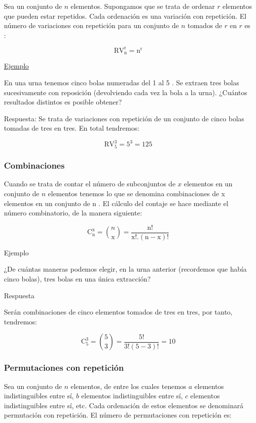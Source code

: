 \documentclass[
]{article}
\begin{document}
Sea un conjunto de \(n\) elementos. Supongamos que se trata de ordenar \(r\)
elementos que pueden estar repetidos. Cada ordenación es una variación
con repetición. El número de variaciones con repetición para un conjunto
de \(n\) tomados de \(r\) en \(r\) es :

\[
\mathrm{RV}_{\mathrm{n}}^{\mathrm{r}}=\mathrm{n}^{\mathrm{r}}
\]

\ul{Ejemplo}

En una urna tenemos cinco bolas numeradas del 1 al 5 . Se extraen tres
bolas sucesivamente con reposición (devolviendo cada vez la bola a la
urna). ¿Cuántos resultados distintos es posible obtener?

Respuesta: Se trata de variaciones con repetición de un conjunto de
cinco bolas tomadas de tres en tres. En total tendremos:

\[
\mathrm{RV}_{5}^{3}=5^{3}=125
\]

\subsubsection{Combinaciones}\label{combinaciones}

Cuando se trata de contar el número de subconjuntos de \(x\) elementos en un conjunto de \(n\) elementos tenemos lo que se denomina combinaciones de
x elementos en un conjunto de n . El cálculo del contaje se hace
mediante el número combinatorio, de la manera siguiente:

\[
\mathrm{C}_{\mathrm{n}}^{\mathrm{x}}=\binom{n}{\mathrm{x}}=\frac{\mathrm{n!}}{\mathrm{x}!.(\mathrm{n}-\mathrm{x})!}
\]

Ejemplo

¿De cuántas maneras podemos elegir, en la urna anterior (recordemos que
había cinco bolas), tres bolas en una única extracción?

Respuesta

Serán combinaciones de cinco elementos tomados de tres en tres, por
tanto, tendremos:

\[
\mathrm{C}_{5}^{3}=\binom{5}{3}=\frac{5!}{3!(5-3)!}=10
\]

\subsubsection{Permutaciones con repetición}\label{permutaciones-con-repeticiuxf3n}

Sea un conjunto de \(n\) elementos, de entre los cuales tenemos \(a\)
elementos indistinguibles entre sí, \(b\) elementos indistinguibles entre
sí, \(c\) elementos indistinguibles entre sí, etc. Cada ordenación de
estos elementos se denominará permutación con repetición. El número de
permutaciones con repetición es:
\end{document}
